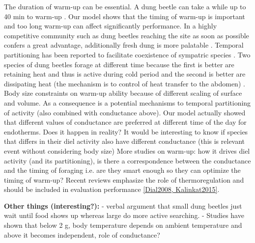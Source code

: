 {The duration of warm-up can be essential.
A dung beetle can take a while up to 40 min to warm-up \citep{Verdu2008}.
Our  model shows that the timing of warm-up is important and too long warm-up can affect significantly performance.
In a highly competitive community such as dung beetles reaching the site as soon as possible confers a great advantage, additionally fresh dung is more palatable \citep{Hanski1991}.
Temporal partitioning has been reported to facilitate coexistence of sympatric species \citep{Verdu2007, Verdu2012}.
Two species of dung beetles forage at different time because the first is better are retaining heat and thus is active during cold period and the second is better are dissipating heat (the mechanism is to control of heat transfer to the abdomen) \citep{Verdu2012}.
Body size constraints on warm-up ability because of different scaling of surface and volume.
As a consequence is a potential mechanisms to temporal partitioning of activity (also combined with conductance above).
Our model actually showed that different values of conductance are preferred at different time of the day for endotherms.
Does it happen in reality? %
It would be interesting to know if species that differs in their diel activity also have different conductance (this is relevant event without considering body size)  
More studies on warm-up: how it drives diel activity (and its partitioning), is there a correspondence between the conductance and the timing of foraging i.e. are they smart enough so they can optimize the timing of warm-up? 
Recent reviews emphasize the role of thermoregulation and should be included in evaluation performance \cref{Dial2008, Kalinkat2015}.


\textbf{Other things (interesting?):} 
- verbal argument that small dung beetles just wait until food shows up whereas  large do more active searching.
- Studies have shown that below 2 g, body temperature depends on ambient temperature and above it becomes independent, role of conductance? 

}
